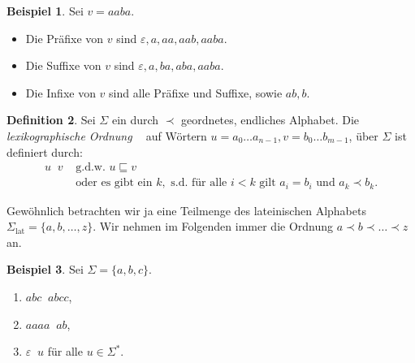 \documentclass[11pt, a4paper]{article}
\theoremstyle{definition}
\newtheorem{definition}{Definition}[section]
\newtheorem{example}[definition]{Beispiel}
\theoremstyle{plain}
\numberwithin{equation}{section}
\DeclareMathOperator{\lex}{\prec_\text{lex}}
\begin{document}
\begin{example}
	Sei $v = aaba$.
	\begin{itemize}
		\item Die Präfixe von $v$ sind $\varepsilon, a, aa, aab, aaba$.
		\item Die Suffixe von $v$ sind $\varepsilon, a, ba, aba, aaba$.
		\item Die Infixe von $v$ sind alle Präfixe und Suffixe, sowie $ab, b$.
	\end{itemize}
\end{example}
\begin{definition}
	Sei $\Sigma$ ein durch $\prec$ geordnetes, endliches Alphabet. Die \textit{lexikographische Ordnung} $\lex$ auf Wörtern $u = a_0 \ldots a_{n-1}, v = b_0 \ldots b_{m-1}$, über $\Sigma$ ist definiert durch:
	\begin{align*}
		u \lex v &\text{ g.d.w. } u \sqsubseteq v\\
		& \text{ oder es gibt ein } k, \text{ s.d. für alle } i < k \text{ gilt } a_i = b_i \text{ und } a_k \prec b_k.
	\end{align*}
\end{definition}
Gewöhnlich betrachten wir ja eine Teilmenge des lateinischen Alphabets $\Sigma_\text{lat} = \{a, b, \ldots, z\}$. Wir nehmen im Folgenden immer die Ordnung $a \prec b \prec \ldots \prec z$ an.
\begin{example}
	Sei $\Sigma = \{a, b, c\}$.
	\begin{enumerate}[label=\arabic*)]
		\item $abc \lex abcc$,
		\item $aaaa \lex ab$,
		\item $\varepsilon \lex u$ für alle $u \in \Sigma^\ast$.
	\end{enumerate}
\end{example}
\end{document}

